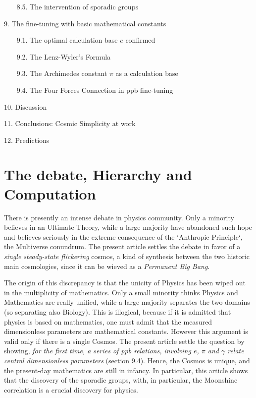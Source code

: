 \documentclass[twoside,draft]{article}
\begin{document}
\begin{sloppypar}
~~~    8.5. The intervention of sporadic groups
   
 9. The fine-tuning with basic mathematical constants
 
~~~    9.1. The optimal calculation base $e$ confirmed
   
~~~    9.2. The Lenz-Wyler's Formula
   
~~~    9.3. The Archimedes constant $\pi$ as a calculation base
   
~~~    9.4. The Four Forces Connection in ppb fine-tuning
  
 10. Discussion
 
 11. Conclusions: Cosmic Simplicity at work
 
 12. Predictions


\section {The debate, Hierarchy and Computation}

There is presently an intense debate in physics community. Only a minority believes in an Ultimate Theory, while a large majority have abandoned such hope and believes seriously in the extreme consequence of the `Anthropic Principle`, the Multiverse conundrum\cite{Carr}. The present article settles the debate in favor of a \textit{single steady-state flickering} cosmos, a kind of synthesis between the two historic main cosmologies, since it can be wieved as a \textit{Permanent Big Bang}.

The origin of this discrepancy is that the unicity of Physics has been wiped out in the multiplicity of mathematics. Only a small minority thinks Physics and Mathematics are really unified, while a large majority separates the two domains (so separating also
Biology). This is illogical, because if it is admitted that physics is based on mathematics, one must admit that the measured dimensionless parameters are mathematical constants. However this argument is  valid only if there is a single Cosmos. The present article settle the question by showing, \textit{for the first time, a series of ppb relations, involving $e$, $\pi$ and $\gamma$ relate central dimensionless parameters} (section 9.4). Hence, the Cosmos is unique, and the present-day mathematics are still in infancy. In particular, this article shows that the discovery of the sporadic groups, with, in particular, the Moonshine correlation\cite{Borcherds} is a crucial discovery for physics. 


\end{sloppypar}
\end{document}
